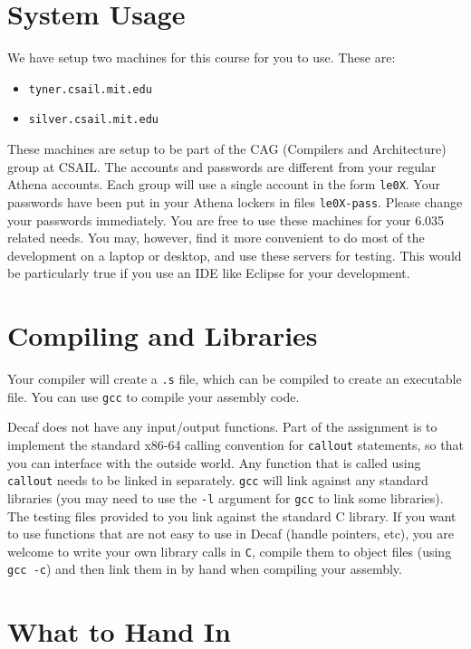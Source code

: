 \section*{System Usage}

We have setup two machines for this course for you to use. These
are:
\begin{itemize}
\item {\tt tyner.csail.mit.edu}
\item {\tt silver.csail.mit.edu}
\end{itemize}
These machines are setup to be part of the CAG (Compilers and
Architecture) group at CSAIL. The accounts and passwords are
different from your regular Athena accounts. Each group will use a
single account in the form {\tt le0X}. Your passwords have been put
in your Athena lockers in files {\tt le0X-pass}. Please change your
passwords immediately. You are free to use these machines for your
6.035 related needs. You may, however, find it more convenient to do
most of the development on a laptop or desktop, and use these
servers for testing. This would be particularly true if you use an
IDE like Eclipse for your development.

\section*{Compiling and Libraries}

Your compiler will create a {\tt .s} file, which can be compiled to
create an executable file. You can use {\tt gcc} to compile
your assembly code.

Decaf does not have any input/output functions. Part of the
assignment is to implement the standard x86-64 calling convention
for {\tt callout} statements, so that you can interface with the
outside world. Any function that is called using {\tt callout} needs
to be linked in separately. {\tt gcc} will link against any standard
libraries (you may need to use the {\tt -l} argument for {\tt gcc}
to link some libraries). The testing files provided to you link
against the standard C library. If you want to use functions that
are not easy to use in Decaf (handle pointers, etc), you are welcome
to write your own library calls in {\tt C}, compile them to object
files (using {\tt gcc -c}) and then link them in by hand when
compiling your assembly.

\section*{What to Hand In}

